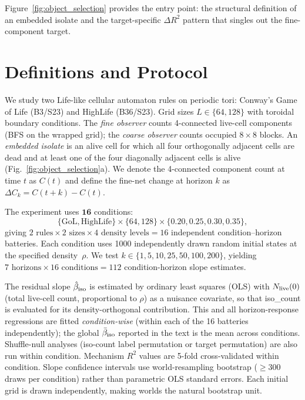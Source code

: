 \documentclass[aip,cha,preprint,nofootinbib]{revtex4-2}
\newcommand{\iso}{{\rm iso}}
\newcommand{\Ck}{\Delta C_k}
\newcommand{\biso}{\hat{\beta}_{\iso}}
\begin{document}
Figure~\ref{fig:object_selection} provides the entry point: the structural
definition of an embedded isolate and the target-specific $\Delta R^2$
pattern that singles out the fine-component target.

\section{Definitions and Protocol}
\label{sec:protocol}

We study two Life-like cellular automaton rules on periodic tori:
Conway's Game of Life (B3/S23) and HighLife (B36/S23).
Grid sizes $L \in \{64, 128\}$ with toroidal boundary conditions.
The \emph{fine observer} counts 4-connected live-cell components
(BFS on the wrapped grid); the \emph{coarse observer} counts occupied
$8\times 8$ blocks.
An \emph{embedded isolate} is an alive cell for which all four
orthogonally adjacent cells are dead and at least one of the four
diagonally adjacent cells is alive (Fig.~\ref{fig:object_selection}a).
We denote the 4-connected component count at time $t$ as $C(t)$
and define the fine-net change at horizon $k$ as
$\Ck = C(t+k) - C(t)$.

The experiment uses $\mathbf{16}$ conditions:
\begin{equation*}
   \{\mathrm{GoL},\mathrm{HighLife}\}
   \times \{64, 128\}
   \times \{0.20, 0.25, 0.30, 0.35\},
\end{equation*}
giving $2 \text{ rules} \times 2 \text{ sizes} \times 4 \text{ density
levels} = 16$ independent condition--horizon batteries.
Each condition uses 1000 independently drawn random initial states at
the specified density~$\rho$.
We test $k \in \{1, 5, 10, 25, 50, 100, 200\}$, yielding
$7\text{ horizons} \times 16\text{ conditions} = 112$ condition-horizon
slope estimates.

The residual slope $\biso$ is estimated by ordinary least squares (OLS)
with $N_{\rm live}(0)$ (total live-cell count, proportional to $\rho$)
as a nuisance covariate, so that iso\_count is evaluated for its
density-orthogonal contribution.
This and all horizon-response regressions are fitted \emph{condition-wise}
(within each of the 16 batteries independently); the global
$\bar\beta_\iso$ reported in the text is the mean across conditions.
Shuffle-null analyses (iso-count label permutation or target permutation)
are also run within condition.
Mechanism $R^2$ values are 5-fold cross-validated within condition.
Slope confidence intervals use world-resampling bootstrap ($\geq 300$
draws per condition) rather than parametric OLS standard errors.
Each initial grid is drawn independently, making worlds the natural
bootstrap unit.
\end{document}
